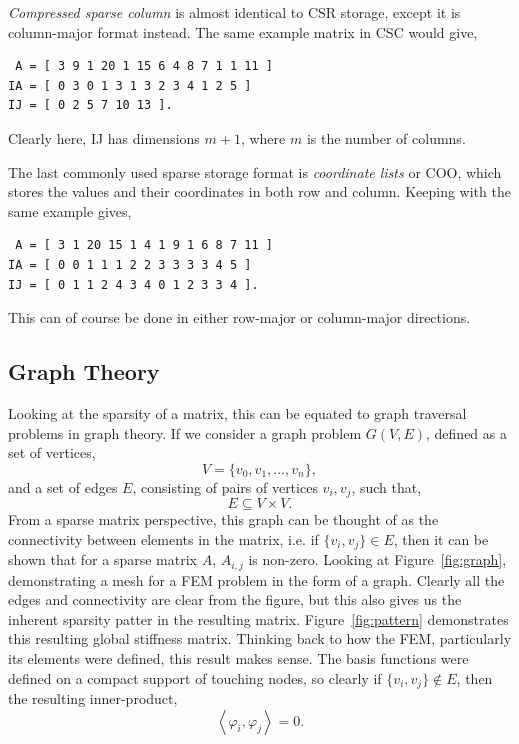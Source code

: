 \textit{Compressed sparse column} is almost identical to CSR storage, except it is column-major format instead. The same example matrix in CSC would give,
\begin{lstlisting}
 A = [ 3 9 1 20 1 15 6 4 8 7 1 1 11 ]
IA = [ 0 3 0 1 3 1 3 2 3 4 1 2 5 ]
IJ = [ 0 2 5 7 10 13 ].
\end{lstlisting}
Clearly here, IJ has dimensions $m+1$, where $m$ is the number of columns.

The last commonly used sparse storage format is \textit{coordinate lists} or COO, which stores the values and their coordinates in both row and column. Keeping with the same example gives,
\begin{lstlisting}
 A = [ 3 1 20 15 1 4 1 9 1 6 8 7 11 ]
IA = [ 0 0 1 1 1 2 2 3 3 3 3 4 5 ]
IJ = [ 0 1 1 2 4 3 4 0 1 2 3 3 4 ].
\end{lstlisting}
This can of course be done in either row-major or column-major directions.

\subsection{Graph Theory}

Looking at the sparsity of a matrix, this can be equated to graph traversal problems in graph theory. If we consider a graph problem $G(V,E)$, defined as a set of vertices,
\begin{equation}
	V = \{v_0,v_1,\dots,v_n\},
\end{equation}
and a set of edges $E$, consisting of pairs of vertices $v_i,v_j$, such that,
\begin{equation}
	E \subseteq V\times V.
\end{equation}
From a sparse matrix perspective, this graph can be thought of as the connectivity between elements in the matrix, i.e. if $\{v_i,v_j\} \in E$, then it can be shown that for a sparse matrix $A$, $A_{i,j}$ is non-zero. Looking at Figure~\ref{fig:graph}, demonstrating a mesh for a FEM problem in the form of a graph. Clearly all the edges and connectivity are clear from the figure, but this also gives us the inherent sparsity patter in the resulting matrix. Figure~\ref{fig:pattern} demonstrates this resulting global stiffness matrix. Thinking back to how the FEM, particularly its elements were defined, this result makes sense. The basis functions were defined on a compact support of touching nodes, so clearly if $\{v_i,v_j\} \notin E$, then the resulting inner-product,
\begin{equation}
	\left\langle \varphi_i, \varphi_j \right\rangle = 0.
\end{equation}

